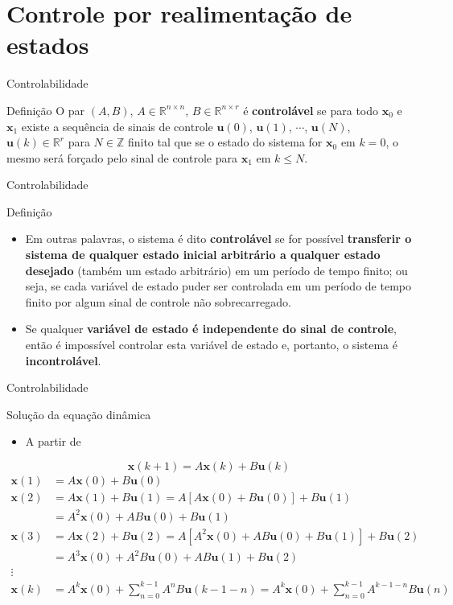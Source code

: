 \section{Controle por realimentação de estados}

\begin{frame}{Controlabilidade}
\begin{block}{Definição}
O par $(A,B)$, $A \in \mathbb{R}^{n \times n}$, $B \in \mathbb{R}^{n \times r}$ é \textbf{controlável} se para todo $\bm{x}_0$ e $\bm{x}_1$ existe a sequência de sinais de controle $\bm{u}(0)$, $\bm{u}(1)$, $\cdots$, $\bm{u}(N)$, $\bm{u}(k) \in \mathbb{R}^{r}$ para $N \in \mathbb{Z}$ finito tal que se o estado do sistema for $\bm{x}_0$ em $k = 0$, o mesmo será forçado pelo sinal de controle para $\bm{x}_1$ em $k \leq N$.
\end{block}
\end{frame}

\begin{frame}{Controlabilidade}
\begin{block}{Definição}
\begin{itemize}
    \item Em outras palavras, o sistema é dito \textbf{controlável} se for possível \textbf{transferir o sistema de qualquer estado inicial arbitrário a qualquer estado desejado} (também um estado arbitrário) em um período de tempo finito; ou seja, se cada variável de estado puder ser controlada em um período de tempo finito por algum sinal de controle não sobrecarregado.
    \item Se qualquer \textbf{variável de estado é independente do sinal de controle}, então é impossível controlar esta variável de estado e, portanto, o sistema é \textbf{incontrolável}.
\end{itemize}
\end{block}
\end{frame}

\begin{frame}{Controlabilidade}
\begin{block}{Solução da equação dinâmica}
\begin{itemize}
    \item A partir de 
\end{itemize}
$$\bm{x}(k+1) = A\bm{x}(k) + B\bm{u}(k)$$
\begin{align*}
    \bm{x}(1) &= A\bm{x}(0) + B\bm{u}(0) \\
    \bm{x}(2) &= A\bm{x}(1) + B\bm{u}(1) = A[A\bm{x}(0) + B\bm{u}(0)] + B\bm{u}(1) \\
    &= A^2\bm{x}(0) + AB\bm{u}(0) + B\bm{u}(1) \\
    \bm{x}(3) &= A\bm{x}(2) + B\bm{u}(2) = A[A^2\bm{x}(0) + AB\bm{u}(0) + B\bm{u}(1)] + B\bm{u}(2) \\
    &= A^3\bm{x}(0) + A^2B\bm{u}(0) + AB\bm{u}(1) + B\bm{u}(2) \\
    \vdots  \\
    \bm{x}(k) &= A^k\bm{x}(0) + \sum_{n=0}^{k-1} A^n B\bm{u}(k-1-n) = A^k\bm{x}(0) + \sum_{n=0}^{k-1} A^{k-1-n} B\bm{u}(n)
\end{align*}
\end{block}
\end{frame}

